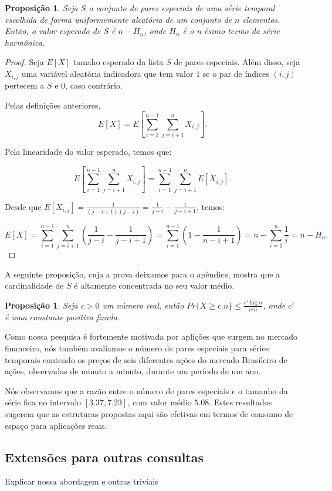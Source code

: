 \documentclass[dissertacao, brazil]{ThesisPUC}
\newtheorem{prop}[thm]{Proposição}
\begin{document}
\begin{prop}
Seja $S$ o conjunto de pares especiais de uma série 
temporal escolhida de forma uniformemente aleatória de um conjunto de $n$ elementos.
Então, o valor esperado de $S$ é $n - H_n$, onde $H_n$ é o n-ésimo termo 
da série harmônica.
\end{prop}
\begin{proof}
Seja $E[X]$ tamaho esperado da lista $S$ de pares especiais.
Além disso, seja $X_{i,j}$ uma variável aleatória indicadora que
tem valor $1$ se o par de índices $(i,j)$ pertecem a $S$ e $0$, caso contrário.

Pelas definições anteriores, 
$$E[X] = E[\sum\limits_{i=1}^{n-1} \sum\limits_{j=i+1}^{n}X_{i,j}].$$

Pela linearidade do valor esperado, temos que:

$$E[\sum\limits_{i=1}^{n-1} \sum\limits_{j=i+1}^{n}X_{i,j}] = \sum\limits_{i=1}^{n-1} \sum\limits_{j=i+1}^{n} E[X_{i,j}].$$

Desde que $E[X_{i,j}] = \frac{1}{(j-i+1)(j-i)} = \frac{1}{j-i} - \frac{1}{j-i+1}$, temos:

$$E[X] = \sum\limits_{i=1}^{n-1} \sum\limits_{j=i+1}^{n}
\left (\frac{1}{j-i} - \frac{1}{j-i+1} \right )
= \sum\limits_{i=1}^{n-1} \left (1 - \frac{1}{n-i+1} \right)
= n - \sum\limits_{i=1}^{n} \frac{1}{i}  =  n - H_n.$$
\end{proof}

A seguinte proposição, cuja a prova deixamos para o apêndice, mostra que 
a cardinalidade de $S$ é altamente concentrada no seu valor médio.

\begin{prop}
Seja $c>0$ um número real, então $Pr\{X \ge c.n\} \le \frac{c' \log n}{c^2n}$, onde
$c'$ é uma constante positiva fixada.
\end{prop}

Como nossa pesquisa é fortemente motivada por aplições que surgem no mercado
financeiro, nós também avaliamos o número de pares especiais para séries temporais
contendo os preços de seis diferentes ações do mercado Brasileiro de ações, observadas
de minuto a minuto, durante um período de um ano. 

Nós observamos que a razão entre o número de pares especiais e o tamanho da série fica no intervalo
$[3.37, 7.23]$, com valor médio $5.08$. Estes resultados sugerem que as estruturas propostas aqui são
 efetivas em termos de consumo de espaço para aplicações reais.  


\subsection{Extensões para outras consultas}
 Explicar nossa abordagem e outras triviais
\end{document}
